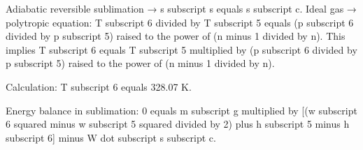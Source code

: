 Adiabatic reversible sublimation → s subscript s equals s subscript c.  
Ideal gas → polytropic equation:  
T subscript 6 divided by T subscript 5 equals (p subscript 6 divided by p subscript 5) raised to the power of (n minus 1 divided by n).  
This implies T subscript 6 equals T subscript 5 multiplied by (p subscript 6 divided by p subscript 5) raised to the power of (n minus 1 divided by n).  

Calculation:  
T subscript 6 equals 328.07 K.  

Energy balance in sublimation:  
0 equals m subscript g multiplied by [(w subscript 6 squared minus w subscript 5 squared divided by 2) plus h subscript 5 minus h subscript 6] minus W dot subscript s subscript c.